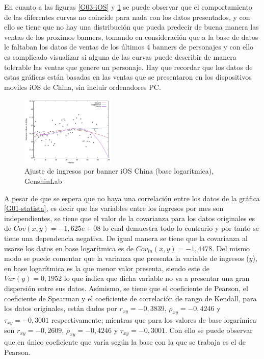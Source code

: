 \documentclass[osajnl,twocolumn,showpacs,superscriptaddress,10pt]{revtex4-2}
\begin{document}
En cuanto a las figuras \ref{G03-iOS} y \ref{G04-iOS} se puede observar que el comportamiento de las diferentes curvas no coincide para nada con los datos presentados, y con ello se tiene que no hay una distribución que pueda predecir de buena manera las ventas de los proximos banners, tomando en consideración que a la base de datos le faltaban los datos de ventas de los últimos 4 banners de personajes y con ello es complicado visualizar si alguna de las curvas puede describir de manera tolerable las ventas que genere un personaje. Hay que recordar que los datos de estas gráficas están basadas en las ventas que se presentaron en los dispositivos moviles iOS de China, sin incluir ordenadores PC.
\begin{figure}[H]
    \begin{center}
        \includegraphics[width=0.4\textwidth]{img/GIBannChRev01.pdf}
        \caption{\label{G04-iOS}Ajuste de ingresos por banner iOS China (base logarítmica), GenshinLab}
    \end{center}
\end{figure}
A pesar de que se espera que no haya una correlación entre los datos de la gráfica \ref{G01-statista}, es decir que las variables entre los ingresos por mes  son independientes, se tiene que el valor de la covarianza para los datos originales es de $Cov(x,y)=-1,625e+08$ lo cual demuestra todo lo contrario y por tanto se tiene una dependencia negativa. De igual manera se tiene que la covarianza al usarse los datos en base logarítmica es de $Cov_{ln}(x,y)=-1,4478$. Del mismo modo se puede comentar que la varianza que presenta la variable de ingresos ($y$), en base logarítmica es la que menor valor presenta, siendo este de $Var(y)=0,1952$ lo que indica que dicha variable no va a presentar una gran dispersión entre sus datos. Asímismo, se tiene que el coeficiente de Pearson, el coeficiente de Spearman y el coeficiente de correlación de rango de Kendall, para los datos originales, están dados por $r_{xy}=-0,3839$, $\rho_{xy}=-0,4246$ y $\tau_{xy}=-0,3001$ respectivamente; mientras que para los valores de base logarímica son $r_{xy}=-0,2609$, $\rho_{xy}=-0,4246$ y $\tau_{xy}=-0,3001$. Con ello se puede observar que en único coeficiente que varía según la base con la que se trabaja es el de Pearson. 
\end{document}
